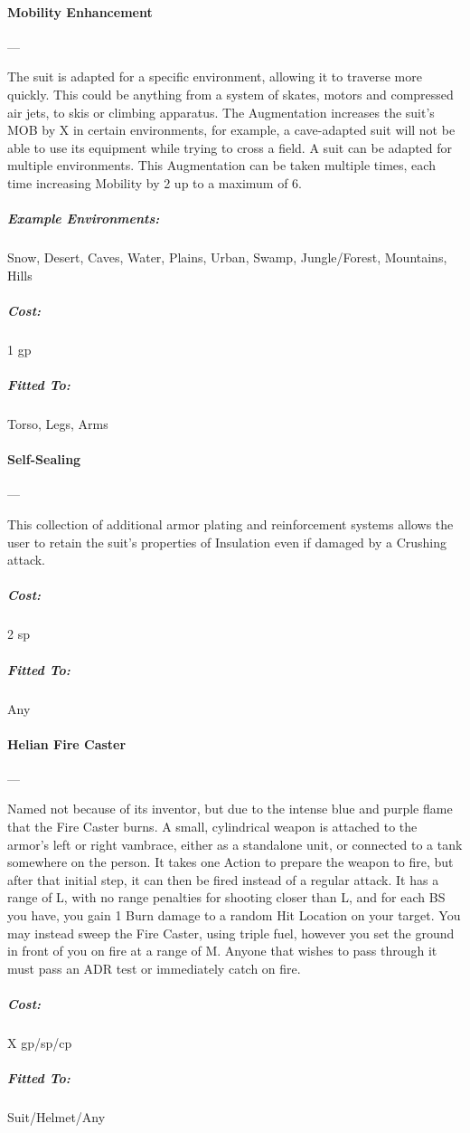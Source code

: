 \documentclass[oneside,11pt,english]{book}
\begin{document}
\paragraph{Mobility Enhancement}---\quad[1]

The suit is adapted for a specific environment, allowing it to traverse more quickly. This could be 
anything from a system of skates, motors and compressed air jets, to skis or climbing apparatus. The 
Augmentation increases the suit’s MOB by X in certain environments, for example, a cave-adapted suit 
will not be able to use its equipment while trying to cross a field. A suit can be adapted for multiple 
environments. This Augmentation can be taken multiple times, each time increasing Mobility by 2 up to a 
maximum of 6.
\vspace{-20pt}\subparagraph{Example Environments:} Snow, Desert, Caves, Water, Plains, Urban, Swamp, Jungle/Forest, Mountains, Hills

\vspace{-15pt}\subparagraph{Cost:} 1 gp
\vspace{-15pt}\subparagraph{Fitted To:} Torso, Legs, Arms

\paragraph{Self-Sealing}---\quad[1]

This collection of additional armor plating and reinforcement systems allows the user to retain the suit’s 
properties of Insulation even if damaged by a Crushing attack. 
\vspace{-15pt}\subparagraph{Cost:} 2 sp
\vspace{-15pt}\subparagraph{Fitted To:} Any

\paragraph{Helian Fire Caster}---\quad[X]

Named not because of its inventor, but due to the intense blue and purple flame that the Fire Caster burns. 
A small, cylindrical weapon is attached to the armor’s left or right vambrace, either as a standalone unit, 
or connected to a tank somewhere on the person. It takes one Action to prepare the weapon to fire, but 
after that initial step, it can then be fired instead of a regular attack. It has a range of L, with no range 
penalties for shooting closer than L, and for each BS you have, you gain 1 Burn damage to a random Hit 
Location on your target. You may instead sweep the Fire Caster, using triple fuel, however you set the 
ground in front of you on fire at a range of M. Anyone that wishes to pass through it must pass an ADR 
test or immediately catch on fire. 
\vspace{-15pt}\subparagraph{Cost:} X gp/sp/cp
\vspace{-15pt}\subparagraph{Fitted To:} Suit/Helmet/Any
\end{document}
